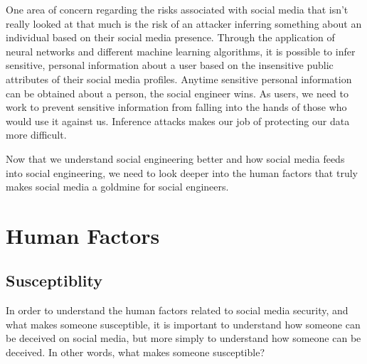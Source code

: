 \documentclass[conference]{IEEEtran}
\begin{document}
One area of concern regarding the risks associated with social media that isn't really looked at that much is the risk of an attacker inferring something about an individual based on their social media presence.  Through the application of neural networks and different machine learning algorithms, it is possible to infer sensitive, personal information about a user based on the insensitive public attributes of their social media profiles\cite{Mei:2017:IAB:3132465.3132469}.  Anytime sensitive personal information can be obtained about a person, the social engineer wins. As users, we need to work to prevent sensitive information from falling into the hands of those who would use it against us.  Inference attacks makes our job of protecting our data more difficult.  

Now that we understand social engineering better and how social media feeds into social engineering, we need to look deeper into the human factors that truly makes social media a goldmine for social engineers. 

\section{Human Factors}
\subsection{Susceptiblity}
In order to understand the human factors related to social media security, and what makes someone susceptible, it is important to understand how someone can be deceived on social media, but more simply to understand how someone can be deceived. In other words, what makes someone susceptible? 
\end{document}
